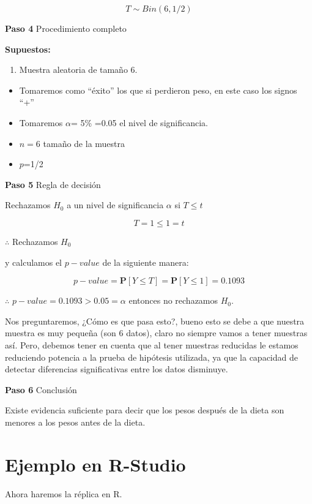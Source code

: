 \documentclass[
  a4paper,
  oneside,
  openany]{book}
\providecommand{\tightlist}{%
  \setlength{\itemsep}{0pt}\setlength{\parskip}{0pt}}
\begin{document}
\[T\sim Bin(6,1/2)\]

\textbf{Paso 4} Procedimiento completo

\textbf{Supuestos:}

\begin{enumerate}
\def\labelenumi{\arabic{enumi}.}
\tightlist
\item
  Muestra aleatoria de tamaño 6.
\end{enumerate}

\begin{itemize}
\item
  Tomaremos como ``éxito'' los que si perdieron peso, en este caso los signos ``+''
\item
  Tomaremos \(\alpha\)= 5\% =0.05 el nivel de significancia.
\item
  \(n=6\) tamaño de la muestra
\item
  \(p\)=1/2
\end{itemize}

\textbf{Paso 5} Regla de decisión

Rechazamos \(H_0\) a un nivel de significancia \(\alpha\) si \(T \leq t\)

\[T=1 \leq 1=t\]

\(\therefore\) Rechazamos \(H_0\)

y calculamos el \(p-value\) de la siguiente manera:

\[p-value=\mathbf{P}[Y\leq T]=\mathbf{P}[Y\leq 1]=0.1093\]

\(\therefore\) \(p-value=0.1093>0.05=\alpha\) entonces no rechazamos \(H_0\).

Nos preguntaremos, ¿Cómo es que pasa esto?, bueno esto se debe a que nuestra muestra es muy pequeña (son 6 datos), claro no siempre vamos a tener muestras así. Pero, debemos tener en cuenta que al tener muestras reducidas le estamos reduciendo potencia a la prueba de hipótesis utilizada, ya que la capacidad de detectar diferencias significativas entre los datos disminuye.

\textbf{Paso 6} Conclusión

Existe evidencia suficiente para decir que los pesos después de la dieta son menores a los pesos antes de la dieta.

\hypertarget{ejemplo-en-r-studio-2}{%
\section{Ejemplo en R-Studio}\label{ejemplo-en-r-studio-2}}

Ahora haremos la réplica en R.
\end{document}
